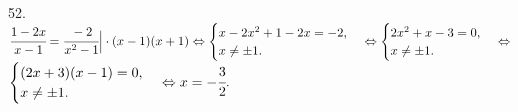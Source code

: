 52. $\cfrac{1-2x}{x-1}=\cfrac{-2}{x^2-1}\Big|\cdot(x-1)(x+1)\Leftrightarrow\begin{cases}x-2x^2+1-2x=-2,\\x\neq\pm1.\end{cases}
\Leftrightarrow\begin{cases}2x^2+x-3=0,\\x\neq\pm1.\end{cases}\Leftrightarrow$\\$\begin{cases}(2x+3)(x-1)=0,\\x\neq\pm1.\end{cases}\Leftrightarrow x=-\cfrac{3}{2}.$\\
